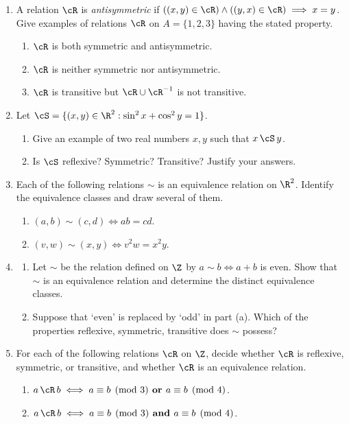 \begin{enumerate}\renewcommand{\labelenumi}{\thesubsection.\theenumi}
	\item A relation $\cR$ is \emph{antisymmetric} if $((x,y)\in \cR)\wedge((y,x)\in \cR)\implies x=y$. Give examples of relations $\cR$ on $A=\{1,2,3\}$ having the stated property.
	\begin{enumerate}
		\item $\cR$ is both symmetric and antisymmetric.
		\item $\cR$ is neither symmetric nor antisymmetric.
		\item $\cR$ is transitive but $\cR\cup \cR^{-1}$ is not transitive.
	\end{enumerate}
	
	\item Let $\cS=\{(x,y)\in\R^2:\sin^2x+\cos^2y=1\}$.
	\begin{enumerate}
	  \item Give an example of two real numbers $x,y$ such that $x\,\cS\,y$.
	  \item Is $\cS$ reflexive? Symmetric? Transitive? Justify your answers.
	\end{enumerate}

	\item Each of the following relations $\sim$ is an equivalence relation on $\R^2$. Identify the equivalence classes and draw several of them.
	\begin{enumerate}
		\item $(a,b)\sim(c,d)\iff ab=cd$.
	  \item $(v,w)\sim(x,y)\iff v^2w=x^2y$.
	\end{enumerate}
	
  \item\begin{enumerate}
  \item Let $\sim$ be the relation defined on $\Z$ by $a\sim b\iff a+b$ is even. Show that $\sim$ is an equivalence relation and determine the distinct equivalence classes.
  \item Suppose that `even' is replaced by `odd' in part (a). Which of the properties reflexive, symmetric, transitive does $\sim$ possess?
  \end{enumerate}

  \item For each of the following relations $\cR$ on $\Z$, decide whether $\cR$ is reflexive, symmetric, or transitive, and whether $\cR$ is an equivalence relation.
	\begin{enumerate}
		\item $a\,\cR\,b \iff a\equiv b\pmod 3 \textbf{ or } a\equiv b\pmod 4$.
		\item $a\,\cR\,b \iff a\equiv b\pmod 3 \textbf{ and } a\equiv b\pmod 4$.
	\end{enumerate}


\end{enumerate}
